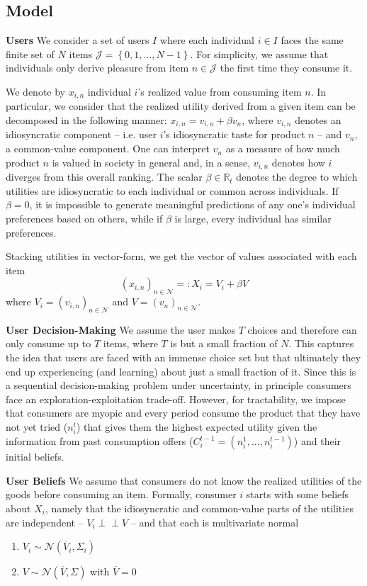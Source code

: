 \documentclass[sigconf, anonymous, review]{acmart}
\begin{document}
\subsection{Model}
\par
\noindent \textbf{Users} We consider a set of users $I$ where each individual $i \in I$ faces the same finite set of $N$ items $\mathcal J = \left\{0,1,...,N-1\right\}$. For simplicity, we assume that individuals only derive pleasure from item $n \in \mathcal{J}$ the first time they consume it.
\par

We denote by $x_{i,n}$ individual $i$'s realized value from consuming item $n$. In particular, we consider that the realized utility derived from a given item can be decomposed in the following manner: $x_{i,n}= v_{i,n} + \beta v_n$, where $v_{i,n}$ denotes an idiosyncratic component -- i.e. user $i$'s idiosyncratic taste for product $n$ --  and $v_{n}$, a common-value component. One can interpret $v_n$ as a measure of how much product $n$ is valued in society in general and, in a sense, $v_{i,n}$ denotes how $i$ diverges from this overall ranking. The scalar $\beta \in \mathbb{R}_{t}$ denotes the degree to which utilities are idiosyncratic to each individual or common across individuals. If $\beta=0$, it is impossible to generate meaningful predictions of any one's individual preferences based on others, while if $\beta$ is large, every individual has similar preferences.
\par
Stacking utilities in vector-form, we get the vector of values associated with each item $${\left(x_{i,n}\right)}_{n \in \mathcal{N}}=:X_i =V_i+ \beta V $$ where $V_i ={\left(v_{i,n}\right)}_{n \in \mathcal{N}}$ and $V={\left(v_{n}\right)}_{n \in \mathcal{N}}$.
\par
\noindent\textbf{User Decision-Making}
We assume the user makes $T$ choices and therefore can only consume up to $T$ items, where $T$ is but a small fraction of $N$. This captures the idea that users are faced with an immense choice set but that ultimately they end up experiencing (and learning) about just a small fraction of it. Since this is a sequential decision-making problem under uncertainty, in principle consumers face an exploration-exploitation trade-off. However, for tractability, we impose that consumers are myopic and every period consume the product that they have not yet tried ($n_i^t$) that gives them the highest expected utility given the information from past consumption offers ($C_i^{t-1}=(n_i^1,...,n_i^{t-1})$) and their initial beliefs.
\par
\noindent \textbf{User Beliefs} We assume that consumers do not know the realized utilities of the goods before consuming an item.
Formally, consumer $i$ starts with some beliefs about $X_i$, namely that the idiosyncratic and common-value parts of the utilities are independent -- $V_i \perp \!\!\! \perp V$ -- and that each is multivariate normal
\begin{enumerate}
\item $V_i \sim \mathcal N (\overline V_i, \Sigma_i)$ 
\item $V \sim \mathcal N(\overline V, \Sigma)$ with $\overline V =0$
\end{enumerate}
\end{document}
